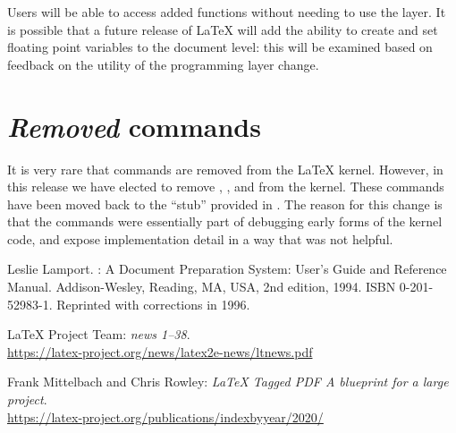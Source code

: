 \documentclass{ltnews}
\providecommand\Dash {\unskip \textemdash}
\begin{document}
Users will be able to access added functions without needing to use the
 layer. It is possible that a future release of \LaTeX{} will
add the ability to create and set floating point variables to the
document level: this will be examined based on feedback on the
utility of the programming layer change.


\section{\emph{Removed} commands}

It is very rare that commands are removed from the \LaTeX{} kernel. However, in
this release we have elected to remove ,
,  and
 from the kernel. These commands have been
moved back to the \enquote{stub}  provided in . The
reason for this change is that the commands were essentially part of debugging
early forms of the kernel code, and expose implementation detail in a way that
was not helpful.







\begin{thebibliography}{9}



Leslie Lamport.
\newblock {\LaTeX}: {A} Document Preparation System: User's Guide and Reference
  Manual.
\newblock \mbox{Addison}-Wesley, Reading, MA, USA, 2nd edition, 1994.
\newblock ISBN 0-201-52983-1.
\newblock Reprinted with corrections in 1996.


 \LaTeX{} Project Team:
  \emph{\LaTeXe{} news 1--38}.\\
  \url{https://latex-project.org/news/latex2e-news/ltnews.pdf}

 Frank Mittelbach and Chris Rowley:
  \emph{\LaTeX{} Tagged PDF \Dash A blueprint for a large project}.\\
  \url{https://latex-project.org/publications/indexbyyear/2020/}



\end{thebibliography}
\end{document}
